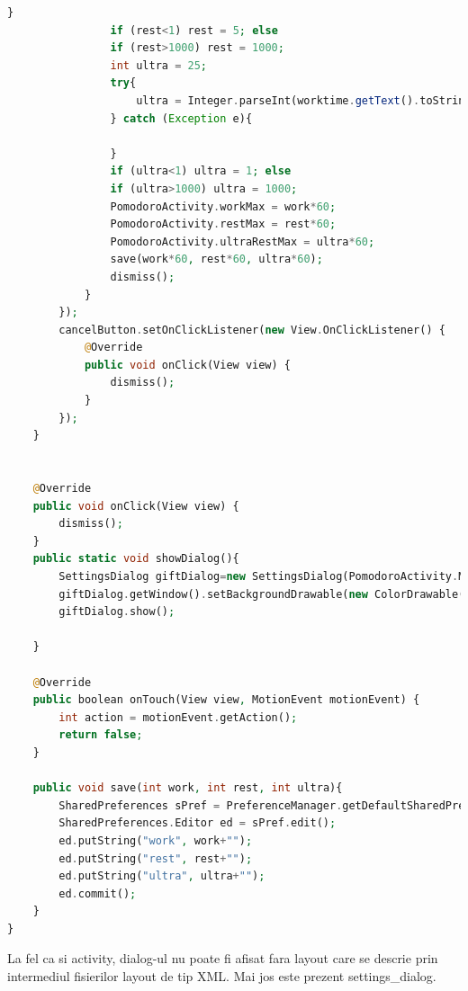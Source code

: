 \documentclass[12pt]{article}
\begin{document}
\begin{lstlisting}[language=php, caption={Fisierul SettingsDialog.php}, label=list2]
                }
                if (rest<1) rest = 5; else
                if (rest>1000) rest = 1000;
                int ultra = 25;
                try{
                    ultra = Integer.parseInt(worktime.getText().toString());
                } catch (Exception e){

                }
                if (ultra<1) ultra = 1; else
                if (ultra>1000) ultra = 1000;
                PomodoroActivity.workMax = work*60;
                PomodoroActivity.restMax = rest*60;
                PomodoroActivity.ultraRestMax = ultra*60;
                save(work*60, rest*60, ultra*60);
                dismiss();
            }
        });
        cancelButton.setOnClickListener(new View.OnClickListener() {
            @Override
            public void onClick(View view) {
                dismiss();
            }
        });
    }


    @Override
    public void onClick(View view) {
        dismiss();
    }
    public static void showDialog(){
        SettingsDialog giftDialog=new SettingsDialog(PomodoroActivity.MainScreen);
        giftDialog.getWindow().setBackgroundDrawable(new ColorDrawable(android.graphics.Color.TRANSPARENT));
        giftDialog.show();

    }

    @Override
    public boolean onTouch(View view, MotionEvent motionEvent) {
        int action = motionEvent.getAction();
        return false;
    }

    public void save(int work, int rest, int ultra){
        SharedPreferences sPref = PreferenceManager.getDefaultSharedPreferences(getContext());
        SharedPreferences.Editor ed = sPref.edit();
        ed.putString("work", work+"");
        ed.putString("rest", rest+"");
        ed.putString("ultra", ultra+"");
        ed.commit();
    }
}

\end{lstlisting}
La fel ca si activity, dialog-ul nu poate fi afisat fara layout care se descrie prin intermediul fisierilor layout de tip XML. Mai jos este prezent settings\_dialog.
\end{document}
